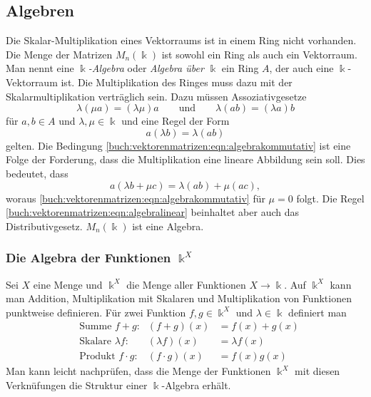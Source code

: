 %
%
%
\subsection{Algebren
\label{buch:grundlagen:subsection:algebren}}
Die Skalar-Multiplikation eines Vektorraums ist in einem Ring nicht
vorhanden.
Die Menge der Matrizen $M_n(\Bbbk)$ ist sowohl ein Ring als auch
ein Vektorraum.
Man nennt eine {\em $\Bbbk$-Algebra} oder {\em Algebra über $\Bbbk$}
%
%
ein Ring $A$, der auch eine $\Bbbk$-Vektorraum ist.
Die Multiplikation des Ringes muss dazu mit der Skalarmultiplikation
verträglich sein.
Dazu müssen Assoziativgesetze
\[
\lambda(\mu a) = (\lambda \mu) a
\qquad\text{und}\qquad
\lambda(ab) = (\lambda a) b
\]
für $a,b\in A$ und $\lambda,\mu\in\Bbbk$
und eine Regel der Form
\begin{equation}
a(\lambda b) = \lambda (ab)
\label{buch:vektorenmatrizen:eqn:algebrakommutativ}
\end{equation}
gelten.
Die Bedingung \eqref{buch:vektorenmatrizen:eqn:algebrakommutativ} ist
eine Folge der Forderung, dass die Multiplikation 
eine lineare Abbildung sein soll.
Dies bedeutet, dass
\begin{equation}
a(\lambda b+\mu c) = \lambda (ab) + \mu (ac),
\label{buch:vektorenmatrizen:eqn:algebralinear}
\end{equation}
woraus 
\eqref{buch:vektorenmatrizen:eqn:algebrakommutativ}
für $\mu=0$ folgt.
Die Regel \eqref{buch:vektorenmatrizen:eqn:algebralinear}
beinhaltet aber auch das Distributivgesetz.
$M_n(\Bbbk)$ ist eine Algebra.

\subsubsection{Die Algebra der Funktionen $\Bbbk^X$}
Sei $X$ eine Menge und $\Bbbk^X$ die Menge aller Funktionen $X\to \Bbbk$.
%
Auf $\Bbbk^X$ kann man Addition, Multiplikation mit Skalaren und
Multiplikation von Funktionen punktweise definieren.
Für zwei Funktion $f,g\in\Bbbk^X$ und $\lambda\in\Bbbk$ definiert man
\[
\begin{aligned}
&\text{Summe $f+g$:}
&
(f+g)(x) &= f(x)+g(x)
\\
&\text{Skalare $\lambda f$:}
&
(\lambda f)(x) &= \lambda f(x)
\\
&\text{Produkt $f\cdot g$:}
&
(f\cdot g)(x) &= f(x) g(x)
\end{aligned}
\]
Man kann leicht nachprüfen, dass die Menge der Funktionen $\Bbbk^X$
mit diesen Verknüfungen die Struktur einer $\Bbbk$-Algebra erhält.

